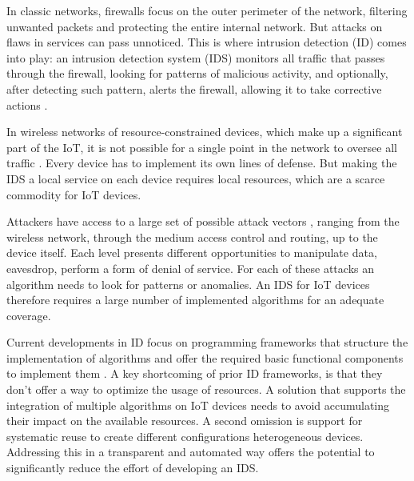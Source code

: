 \documentclass[conference]{IEEEtran}
\begin{document}

In classic networks, firewalls focus on the outer perimeter of the network,
filtering unwanted packets and protecting the entire internal network. But
attacks on flaws in services can pass unnoticed. This is where intrusion
detection (ID) comes into play: an intrusion detection system (IDS) monitors
all traffic that passes through the firewall, looking for patterns of malicious
activity, and optionally, after detecting such pattern, alerts the firewall,
allowing it to take corrective actions \cite{denning1987intrusion}.


In wireless networks of resource-constrained devices, which make up a
significant part of the IoT, it is not possible for a single point in the
network to oversee all traffic \cite{mishra2004intrusion}. Every device has to
implement its own lines of defense. But making the IDS a local service on each
device requires local resources, which are a scarce commodity for IoT devices.

Attackers have access to a large set of possible attack vectors
\cite{aschenbruck2012security}, ranging from the wireless network, through the
medium access control and routing, up to the device itself. Each level presents
different opportunities to manipulate data, eavesdrop, perform a form of denial
of service. For each of these attacks an algorithm needs to look for patterns
or anomalies. An IDS for IoT devices therefore requires a large number of
implemented algorithms for an adequate coverage.


Current developments in ID focus on programming frameworks that structure the
implementation of algorithms \cite{valero2012di} and offer the required basic
functional components to implement them \cite{krontiris2008lidea}. A key
shortcoming of prior ID frameworks, is that they don't offer a way to optimize
the usage of resources. A solution that supports the integration of multiple
algorithms on IoT devices needs to avoid accumulating their impact on the
available resources. A second omission is support for systematic reuse to
create different configurations heterogeneous devices. Addressing this in a
transparent and automated way offers the potential to significantly reduce the
effort of developing an IDS.


\end{document}
